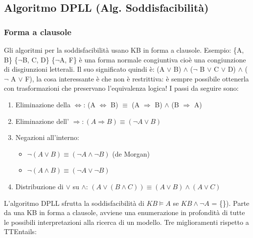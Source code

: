 \documentclass{article}
\begin{document}
\subsection{Algoritmo DPLL (Alg. Soddisfacibilità)}
\subsubsection{Forma a clausole}
Gli algoritmi per la soddisfacibilità usano KB in forma a clausole. \newline 
Esempio: \{A, B\} \{$\neg$B, C, D\} \{$\neg$A, F\} \newline
è una forma normale congiuntiva cioè una congiunzione di disgiunzioni letterali. Il suo significato quindi è: \newline (A $\lor$ B) $\land$ ($\neg$ B $\lor$ C $\lor$ D) $\land$ ($\neg$ A $\lor$ F), la cosa interessante è che non è restrittiva: è sempre possibile ottenerla con trasformazioni che preservano l’equivalenza logica! I passi da seguire sono: \begin{enumerate}
    \item Eliminazione della $\Leftrightarrow$: (A $\Leftrightarrow$ B) $\equiv$ (A $\Rightarrow$ B) $\land$ (B $\Rightarrow$ A)
    \item Eliminazione dell’ $\Rightarrow: (A \Rightarrow B) \equiv (\neg A \lor B)$
    \item Negazioni all’interno: \begin{itemize}
        \item $\neg (A \lor B) \equiv (\neg A \land \neg B)$	(de Morgan)	
        \item $\neg (A \land B) \equiv (\neg A \lor \neg B)$
    \end{itemize}   
    \item Distribuzione di $\lor$ su $\land$: $(A \lor (B \land C)) \equiv (A \lor B) \land (A \lor C)$
\end{enumerate}
L'algoritmo DPLL sfrutta la soddisfacibilità di $KB \models A$ se $KB \land \neg A$ = \{\}). Parte da una KB in forma a clausole, avviene una enumerazione in profondità di tutte le possibili interpretazioni alla ricerca di un modello. Tre miglioramenti rispetto a TTEntails: 
\end{document}
